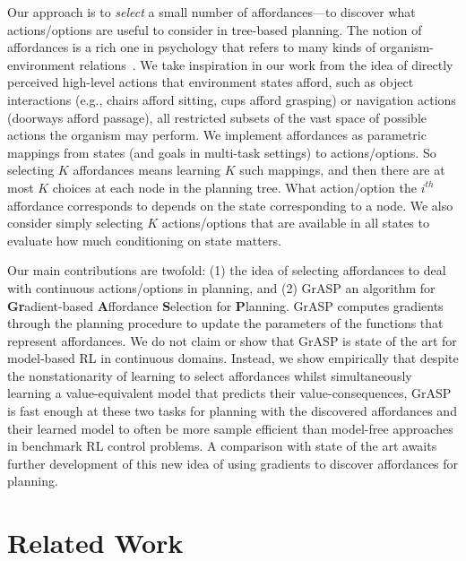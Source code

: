 \documentclass[nohyperref]{article}
\theoremstyle{plain}
\theoremstyle{definition}
\theoremstyle{remark}
\newcommand{\grasp}{{G}r{ASP} }
\begin{document}
Our approach is to \emph{select} a small number of affordances---to discover what actions/options are useful to consider in tree-based planning. The notion of affordances is a rich one in psychology that refers to many kinds of organism-environment relations~\citep{gibson1977concept}. We take inspiration in our work from the idea of directly perceived high-level actions that environment states afford, such as object interactions (e.g., chairs afford sitting, cups afford grasping) or navigation actions (doorways afford passage), all restricted subsets of the vast space of possible actions the organism may perform. 
We implement affordances as parametric mappings from states (and goals in multi-task settings) to actions/options. So selecting $K$ affordances means learning $K$ such mappings, and then there are at most $K$ choices at each node in the planning tree. What action/option the $i^{th}$ affordance corresponds to depends on the state corresponding to a node. We also consider simply selecting $K$ actions/options that are available in all states %
to evaluate how much conditioning on state matters. 

Our main contributions are twofold: (1) the idea of selecting affordances to deal with continuous actions/options in planning, and (2) \grasp an algorithm for {\bf Gr}adient-based {\bf A}ffordance {\bf S}election for {\bf P}lanning. \grasp computes gradients through the planning procedure to update the parameters of the functions that represent affordances. We do not claim or show that {G}r{ASP} is state of the art for model-based RL in continuous domains. Instead, we show empirically that despite the nonstationarity of learning to select affordances whilst simultaneously learning a value-equivalent model that predicts their value-consequences, {G}r{ASP} is fast enough at these two tasks for planning with the discovered affordances and their learned model to often be more sample efficient than model-free approaches in benchmark RL control problems. A comparison with state of the art awaits further development of this new idea of using gradients to discover affordances for planning. 

\section{Related Work}
\end{document}
